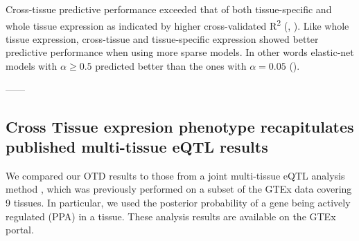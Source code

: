 \documentclass[10pt,letterpaper]{article}
\begin{document}

Cross-tissue predictive performance exceeded that of both tissue-specific and whole tissue expression as indicated by higher cross-validated R\textsuperscript{2} (, ). Like whole tissue expression, cross-tissue and tissue-specific expression showed better predictive performance when using more sparse models. In other words elastic-net models with \(\alpha \geq 0.5\) predicted better than the ones with \(\alpha=0.05\) (). 

------


\subsection*{Cross Tissue expresion phenotype recapitulates published multi-tissue eQTL results}

We compared our OTD results to those from a joint multi-tissue eQTL analysis method \cite{Flutre_2013}, which was previously performed on a subset of the GTEx data \cite{Ardlie_2015} covering 9 tissues. In particular, we used the posterior probability of a gene being actively regulated  (PPA) in a tissue. These analysis results are available on the GTEx portal.
\end{document}

